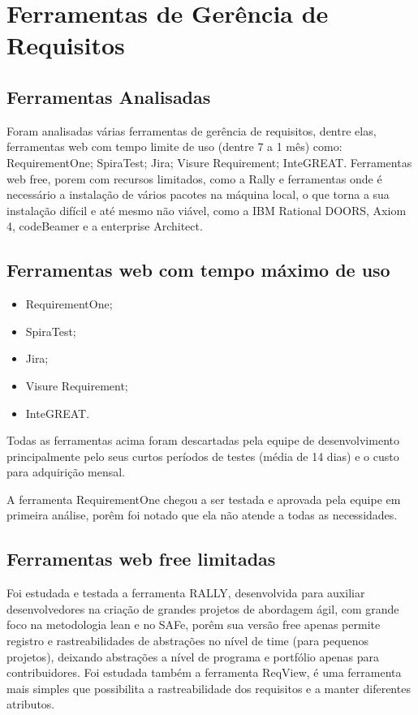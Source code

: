\section{Ferramentas de Gerência de Requisitos}
	
	\subsection{Ferramentas Analisadas}
	
		Foram analisadas várias ferramentas de gerência de requisitos, dentre elas, ferramentas web com tempo limite de uso (dentre 7 a 1 mês) como: RequirementOne; SpiraTest; Jira; Visure Requirement; InteGREAT. Ferramentas web free, porem com recursos limitados, como a Rally e ferramentas onde é necessário a instalação de vários pacotes na máquina local, o que torna a sua instalação difícil e até mesmo não viável, como a IBM Rational DOORS, Axiom 4, codeBeamer e a enterprise Architect.

	\subsection{Ferramentas web com tempo máximo de uso}
	\begin{itemize}
		\item RequirementOne;
		\item SpiraTest;
		\item Jira;
		\item Visure Requirement;
		\item InteGREAT.
	\end{itemize}
		Todas as ferramentas acima foram descartadas pela equipe de desenvolvimento principalmente pelo seus curtos períodos de testes (média de 14 dias) e o custo para adquirição mensal.
		\par A ferramenta RequirementOne chegou a ser testada e aprovada pela equipe em primeira análise, porêm foi notado que ela não atende a todas as necessidades.

	\subsection{Ferramentas web free limitadas}
		Foi estudada e testada a ferramenta RALLY, desenvolvida para auxiliar desenvolvedores na criação de grandes projetos de abordagem ágil, com grande foco na metodologia lean e no SAFe, porêm sua versão free apenas permite registro e rastreabilidades de abstrações no nível de time (para pequenos projetos), deixando abstrações a nível de programa e portfólio apenas para contribuidores. Foi estudada também a ferramenta ReqView, é uma ferramenta mais simples que possibilita a rastreabilidade dos requisitos e a manter diferentes atributos.

